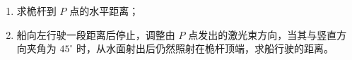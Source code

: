 \begin{enumerate}
\begin{enumerate}
\begin{enumerate}
\renewcommand{\labelenumiii}{\roman{enumiii}.}
\item
求桅杆到 $ P $ 点的水平距离；
\item 
船向左行驶一段距离后停止，调整由 $ P $ 点发出的激光束方向，当其与竖直方向夹角为 $ 45 ^{ \circ } $
时，从水面射出后仍然照射在桅杆顶端，求船行驶的距离。




\end{enumerate}
\begin{figure}[h!]
\flushright

\end{figure}





\end{enumerate}




\end{enumerate}


